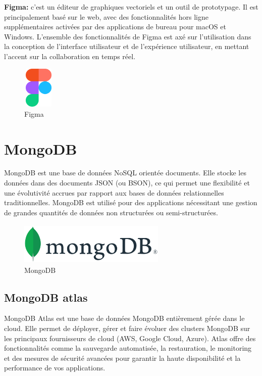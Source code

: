\documentclass[edit,12pt,a4paper,ChapStyle,oneside,doubleinterligne]{report}
\begin{document}
\textbf{Figma:} c'est un éditeur de graphiques vectoriels et un outil de prototypage. Il est principalement basé sur le web, avec des fonctionnalités hors ligne supplémentaires activées par des applications de bureau pour macOS et Windows. L'ensemble des fonctionnalités de Figma est axé sur l'utilisation dans la conception de l'interface utilisateur et de l'expérience utilisateur, en mettant l'accent sur la collaboration en temps réel. \cite{figma}
  \begin{figure}[H] 
    \centering
    \includegraphics[width=1.5cm , height = 2cm , angle=360]{images/figma.png}
    \caption{Figma}
    \label{fig:figma}
\end{figure}
\section{MongoDB} MongoDB est une base de données NoSQL orientée documents. Elle stocke les données dans des documents JSON (ou BSON), ce qui permet une flexibilité et une évolutivité accrues par rapport aux bases de données relationnelles traditionnelles. MongoDB est utilisé pour des applications nécessitant une gestion de grandes quantités de données non structurées ou semi-structurées.
\begin{figure}[H] 
    \centering
    \includegraphics[width=7cm , height = 2cm , angle=360]{images/mongodb.png}
    \caption{MongoDB}
    \label{fig:MongoDB}
\end{figure}
\subsection{MongoDB atlas}
MongoDB Atlas est une base de données MongoDB entièrement gérée dans le cloud. Elle permet de déployer, gérer et faire évoluer des clusters MongoDB sur les principaux fournisseurs de cloud (AWS, Google Cloud, Azure). Atlas offre des fonctionnalités comme la sauvegarde automatisée, la restauration, le monitoring et des mesures de sécurité avancées pour garantir la haute disponibilité et la performance de vos applications.\cite{atlas}
\end{document}
